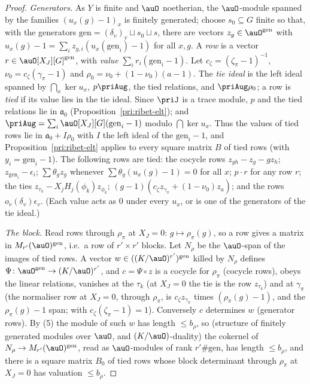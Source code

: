\documentclass[10pt]{amsart}
\theoremstyle{definition}
\theoremstyle{remark}
\begin{document}
\begin{proof}
\emph{Generators.} As $Y$ is finite and $\auO$ noetherian, the $\auO$-module spanned by the families
$(u_x(g)-1)_x$ is finitely generated; choose $s_0\subseteq G$ finite so that, with the generators
$\mathrm{gen}=(\delta_v)_v\sqcup s_0\sqcup s$, there are vectors $z_g\in\auO^{\mathrm{gen}}$ with
$u_x(g)-1=\sum_iz_{g,i}(u_x(\mathrm{gen}_i)-1)$ for all $x,g$. A \emph{row} is a vector $r\in
\auO[X_J][G]^{\mathrm{gen}}$, with \emph{value} $\sum_ir_i(\mathrm{gen}_i-1)$. Let $c_\zeta=(\zeta_\pi-1)
^{-1}$, $\nu_0=c_\zeta(\gamma_\pi-1)$ and $\rho_0=\nu_0+(1-\nu_0)(a-1)$. The \emph{tie ideal} is the left
ideal spanned by $\bigcap_x\ker u_x$, $p\priAug$, the tied relations, and $\priAug\rho_0$; a row is
\emph{tied} if its value lies in the tie ideal. Since $\priJ$ is a trace module, $p$ and the tied
relations lie in $\mathfrak a_0$ (Proposition~\ref{pri:ribet-elt}); and $\priAug=\sum_i\auO[X_J][G]
(\mathrm{gen}_i-1)$ modulo $\bigcap\ker u_x$. Thus the values of tied rows lie in $\mathfrak a_0+
I\rho_0$ with $I$ the left ideal of the $\mathrm{gen}_i-1$, and Proposition~\ref{pri:ribet-elt}
applies to every square matrix $B$ of tied rows (with $y_i=\mathrm{gen}_i-1$). The following rows are
tied: the cocycle rows $z_{gh}-z_g-g z_h$; $z_{\mathrm{gen}_i}-\epsilon_i$; $\sum\theta_gz_g$ whenever
$\sum\theta_g(u_x(g)-1)=0$ for all $x$; $p\cdot r$ for any row $r$; the ties $z_{\tau_k}-X_jH_j(
\phi_k)z_{\phi_k}$; $(g-1)(c_\zeta z_{\gamma_\pi}+(1-\nu_0)z_a)$; and the rows $o_v(\delta_v)\epsilon_v$.
(Each value acts as $0$ under every $u_x$, or is one of the generators of the tie ideal.)

\emph{The block.} Read rows through $\rho_\pi$ at $X_J=0$: $g\mapsto\rho_\pi(g)$, so a row gives a
matrix in $M_{r'}(\auO)^{\mathrm{gen}}$, i.e.\ a row of $r'\times r'$ blocks. Let $N_\rho$ be the
$\auO$-span of the images of tied rows. A vector $w\in((K/\auO)^{r'})^{\mathrm{gen}}$ killed by
$N_\rho$ defines $\Psi\colon\auO^{\mathrm{gen}}\to(K/\auO)^{r'}$, and $c=\Psi\circ z$ is a cocycle for
$\rho_\pi$ (cocycle rows), obeys the linear relations, vanishes at the $\tau_k$ (at $X_J=0$ the tie
is the row $z_{\tau_k}$) and at $\gamma_\pi$ (the normaliser row at $X_J=0$, through $\rho_\pi$, is
$c_\zeta z_{\gamma_\pi}$ times $(\rho_\pi(g)-1)$, and the $\rho_\pi(g)-1$ span; with $c_\zeta(\zeta_\pi-1)=
1$). Conversely $c$ determines $w$ (generator rows). By (5) the module of such $w$ has length $\le
b_\rho$, so (structure of finitely generated modules over $\auO$, and $(K/\auO)$-duality) the cokernel of
$N_\rho\to M_{r'}(\auO)^{\mathrm{gen}}$, read as $\auO$-modules of rank $r'\#\mathrm{gen}$, has length
$\le b_\rho$, and there is a square matrix $B_0$ of tied rows whose block determinant through $\rho_\pi$
at $X_J=0$ has valuation $\le b_\rho$.


\end{proof}
\end{document}

